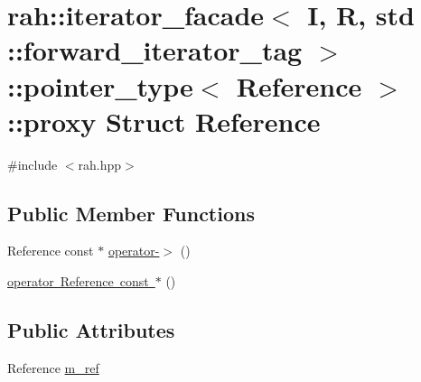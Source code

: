 \hypertarget{structrah_1_1iterator__facade_3_01_i_00_01_r_00_01std_01_1_1forward__iterator__tag_01_4_1_1pointer__type_1_1proxy}{}\section{rah\+::iterator\+\_\+facade$<$ I, R, std \+::forward\+\_\+iterator\+\_\+tag $>$\+::pointer\+\_\+type$<$ Reference $>$\+::proxy Struct Reference}
\label{structrah_1_1iterator__facade_3_01_i_00_01_r_00_01std_01_1_1forward__iterator__tag_01_4_1_1pointer__type_1_1proxy}


{\ttfamily \#include $<$rah.\+hpp$>$}

\subsection*{Public Member Functions}
\begin{DoxyCompactItemize}
\item 
Reference const  $\ast$ \mbox{\hyperlink{structrah_1_1iterator__facade_3_01_i_00_01_r_00_01std_01_1_1forward__iterator__tag_01_4_1_1pointer__type_1_1proxy_af516164141d8633cadcd5be307a07794}{operator-\/$>$}} ()
\item 
\mbox{\hyperlink{structrah_1_1iterator__facade_3_01_i_00_01_r_00_01std_01_1_1forward__iterator__tag_01_4_1_1pointer__type_1_1proxy_abea40ea5825dd18cff0bead252b80889}{operator Reference const $\ast$}} ()
\end{DoxyCompactItemize}
\subsection*{Public Attributes}
\begin{DoxyCompactItemize}
\item 
Reference \mbox{\hyperlink{structrah_1_1iterator__facade_3_01_i_00_01_r_00_01std_01_1_1forward__iterator__tag_01_4_1_1pointer__type_1_1proxy_a43f4d891456f1f4c0bb1c05ca56c74c9}{m\+\_\+ref}}
\end{DoxyCompactItemize}


